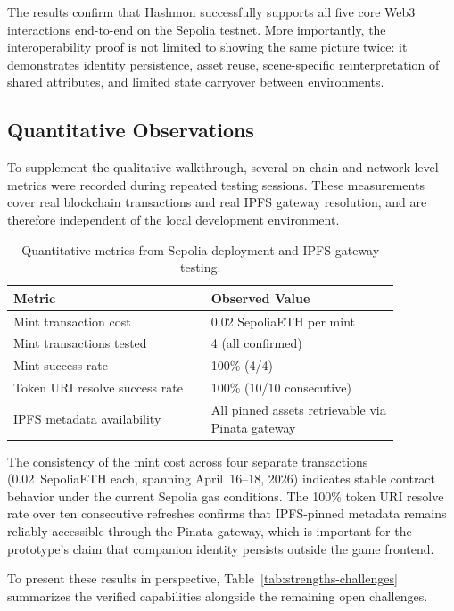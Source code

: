 \documentclass[sigconf]{acmart}
\begin{document}
The results confirm that Hashmon successfully supports all five core Web3 interactions end-to-end on the Sepolia testnet. More importantly, the interoperability proof is not limited to showing the same picture twice: it demonstrates identity persistence, asset reuse, scene-specific reinterpretation of shared attributes, and limited state carryover between environments.

\subsection{Quantitative Observations}
To supplement the qualitative walkthrough, several on-chain and network-level metrics were recorded during repeated testing sessions. These measurements cover real blockchain transactions and real IPFS gateway resolution, and are therefore independent of the local development environment.

\begin{table}[t]
  \caption{Quantitative metrics from Sepolia deployment and IPFS gateway testing.}
  \label{tab:quant}
  \centering
  \begin{tabular}{p{0.44\linewidth}p{0.42\linewidth}}
    \toprule
    \textbf{Metric} & \textbf{Observed Value} \\
    \midrule
    Mint transaction cost          & 0.02 SepoliaETH per mint \\
    Mint transactions tested       & 4 (all confirmed) \\
    Mint success rate              & 100\% (4/4) \\
    Token URI resolve success rate & 100\% (10/10 consecutive) \\
    IPFS metadata availability     & All pinned assets retrievable via Pinata gateway \\
    \bottomrule
  \end{tabular}
\end{table}

The consistency of the mint cost across four separate transactions (0.02~SepoliaETH each, spanning April~16--18, 2026) indicates stable contract behavior under the current Sepolia gas conditions. The 100\% token URI resolve rate over ten consecutive refreshes confirms that IPFS-pinned metadata remains reliably accessible through the Pinata gateway, which is important for the prototype's claim that companion identity persists outside the game frontend.

To present these results in perspective, Table~\ref{tab:strengths-challenges} summarizes the verified capabilities alongside the remaining open challenges.
\end{document}
